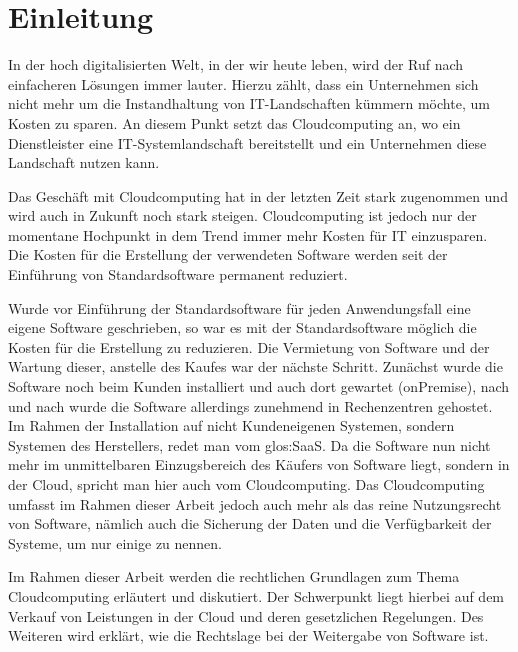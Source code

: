 \chapter{Einleitung}
In der hoch digitalisierten Welt, in der wir heute leben, wird der Ruf nach einfacheren Lösungen immer lauter.
Hierzu zählt, dass ein Unternehmen sich nicht mehr um die Instandhaltung von IT-Landschaften kümmern möchte, um Kosten zu sparen.
An diesem Punkt setzt das Cloudcomputing an, wo ein Dienstleister eine IT-Systemlandschaft bereitstellt und ein Unternehmen diese Landschaft nutzen kann.\par
Das Geschäft mit Cloudcomputing hat in der letzten Zeit stark zugenommen und wird auch in Zukunft noch stark steigen.
Cloudcomputing ist jedoch nur der momentane Hochpunkt in dem Trend immer mehr Kosten für IT einzusparen.
Die Kosten für die Erstellung der verwendeten Software werden seit der Einführung von Standardsoftware permanent reduziert.\par
Wurde vor Einführung der Standardsoftware für jeden Anwendungsfall eine eigene Software geschrieben, so war es mit der Standardsoftware möglich die Kosten für die Erstellung zu reduzieren.
Die Vermietung von Software und der Wartung dieser, anstelle des Kaufes war der nächste Schritt.
Zunächst wurde die Software noch beim Kunden installiert und auch dort gewartet ({\glqq}onPremise{\grqq}), nach und nach wurde die Software allerdings zunehmend in Rechenzentren gehostet.
Im Rahmen der Installation auf nicht Kundeneigenen Systemen, sondern Systemen des Herstellers, redet man vom {\glqq}\gls{glos:SaaS}{\grqq}.
Da die Software nun nicht mehr im unmittelbaren Einzugsbereich des Käufers von Software liegt, sondern in der Cloud, spricht man hier auch vom Cloudcomputing.
Das Cloudcomputing umfasst im Rahmen dieser Arbeit jedoch auch mehr als das reine Nutzungsrecht von Software, nämlich auch die Sicherung der Daten und die Verfügbarkeit der Systeme, um nur einige zu nennen.\par
Im Rahmen dieser Arbeit werden die rechtlichen Grundlagen zum Thema Cloudcomputing erläutert und diskutiert.
Der Schwerpunkt liegt hierbei auf dem Verkauf von Leistungen in der Cloud und deren gesetzlichen Regelungen.
Des Weiteren wird erklärt, wie die Rechtslage bei der Weitergabe von Software ist.
